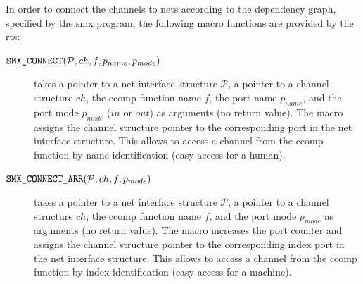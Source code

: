 In order to connect the channels to nets according to the dependency graph, specified by the \gls*{smx} program, the following macro functions are provided by the \gls{rts}:
\begin{description}
    \item[$\textnormal{\tt SMX\_CONNECT}(\mathcal{P}, ch, f, p_{name}, p_{mode})$] takes a pointer to a net interface structure $\mathcal{P}$, a pointer to a channel structure $ch$, the \gls*{ccomp} function name $f$, the port name $p_{name}$, and the port mode $p_{mode}$ (\eg $in$ or $out$) as arguments (no return value).
        The macro assigns the channel structure pointer to the corresponding port in the net interface structure.
        This allows to access a channel from the \gls*{ccomp} function by name identification (easy access for a human).
    \item[$\textnormal{\tt SMX\_CONNECT\_ARR}(\mathcal{P}, ch, f, p_{mode})$] takes a pointer to a net interface structure $\mathcal{P}$, a pointer to a channel structure $ch$, the \gls*{ccomp} function name $f$, and the port mode $p_{mode}$ as arguments (no return value).
        The macro increases the port counter and assigns the channel structure pointer to the corresponding index port in the net interface structure.
        This allows to access a channel from the \gls*{ccomp} function by index identification (easy access for a machine).
\end{description}

